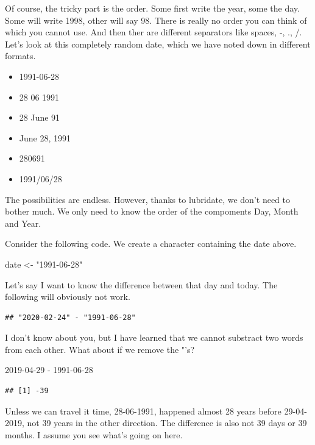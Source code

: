 \documentclass[]{tufte-book}
\newenvironment{Shaded}{}{}
\newcommand{\DecValTok}[1]{\textcolor[rgb]{0.25,0.63,0.44}{#1}}
\newcommand{\NormalTok}[1]{#1}
\newcommand{\OperatorTok}[1]{\textcolor[rgb]{0.40,0.40,0.40}{#1}}
\newcommand{\StringTok}[1]{\textcolor[rgb]{0.25,0.44,0.63}{#1}}
\providecommand{\tightlist}{%
  \setlength{\itemsep}{0pt}\setlength{\parskip}{0pt}}
\begin{document}
Of course, the tricky part is the order. Some first write the year, some the day. Some will write 1998, other will say 98. There is really no order you can think of which you cannot use. And then ther are different separators like spaces, -, ., /. Let's look at this completely random date, which we have noted down in different formats.

\begin{itemize}
\tightlist
\item
  1991-06-28
\item
  28 06 1991
\item
  28 June 91
\item
  June 28, 1991
\item
  280691
\item
  1991/06/28
\end{itemize}

The possibilities are endless. However, thanks to lubridate, we don't need to bother much. We only need to know the order of the compoments Day, Month and Year.

Consider the following code. We create a character containing the date above.

\begin{Shaded}
\begin{Highlighting}[]
\NormalTok{date <-}\StringTok{ "1991-06-28"}
\end{Highlighting}
\end{Shaded}

Let's say I want to know the difference between that day and today. The following will obviously not work.

\begin{verbatim}
## "2020-02-24" - "1991-06-28"
\end{verbatim}

I don't know about you, but I have learned that we cannot substract two words from each other. What about if we remove the "'s?

\begin{Shaded}
\begin{Highlighting}[]
\DecValTok{2019-04-29} \OperatorTok{-}\StringTok{ }\DecValTok{1991-06-28}
\end{Highlighting}
\end{Shaded}

\begin{verbatim}
## [1] -39
\end{verbatim}

Unless we can travel it time, 28-06-1991, happened almost 28 years before 29-04-2019, not 39 years in the other direction. The difference is also not 39 days or 39 months. I assume you see what's going on here.
\end{document}
